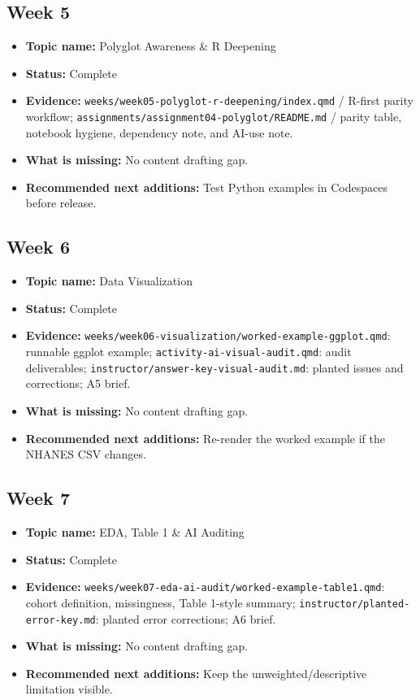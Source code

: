 \documentclass[
  letterpaper,
  DIV=11,
  numbers=noendperiod,
  oneside]{scrreprt}
\providecommand{\tightlist}{%
  \setlength{\itemsep}{0pt}\setlength{\parskip}{0pt}}
\begin{document}
\subsection{Week 5}\label{week-5}

\begin{itemize}
\tightlist
\item
  \textbf{Topic name:} Polyglot Awareness \& R Deepening
\item
  \textbf{Status:} Complete
\item
  \textbf{Evidence:}
  \texttt{weeks/week05-polyglot-r-deepening/index.qmd} / R-first parity
  workflow; \texttt{assignments/assignment04-polyglot/README.md} /
  parity table, notebook hygiene, dependency note, and AI-use note.
\item
  \textbf{What is missing:} No content drafting gap.
\item
  \textbf{Recommended next additions:} Test Python examples in
  Codespaces before release.
\end{itemize}

\subsection{Week 6}\label{week-6}

\begin{itemize}
\tightlist
\item
  \textbf{Topic name:} Data Visualization
\item
  \textbf{Status:} Complete
\item
  \textbf{Evidence:}
  \texttt{weeks/week06-visualization/worked-example-ggplot.qmd}:
  runnable ggplot example; \texttt{activity-ai-visual-audit.qmd}: audit
  deliverables; \texttt{instructor/answer-key-visual-audit.md}: planted
  issues and corrections; A5 brief.
\item
  \textbf{What is missing:} No content drafting gap.
\item
  \textbf{Recommended next additions:} Re-render the worked example if
  the NHANES CSV changes.
\end{itemize}

\subsection{Week 7}\label{week-7}

\begin{itemize}
\tightlist
\item
  \textbf{Topic name:} EDA, Table 1 \& AI Auditing
\item
  \textbf{Status:} Complete
\item
  \textbf{Evidence:}
  \texttt{weeks/week07-eda-ai-audit/worked-example-table1.qmd}: cohort
  definition, missingness, Table 1-style summary;
  \texttt{instructor/planted-error-key.md}: planted error corrections;
  A6 brief.
\item
  \textbf{What is missing:} No content drafting gap.
\item
  \textbf{Recommended next additions:} Keep the unweighted/descriptive
  limitation visible.
\end{itemize}
\end{document}
